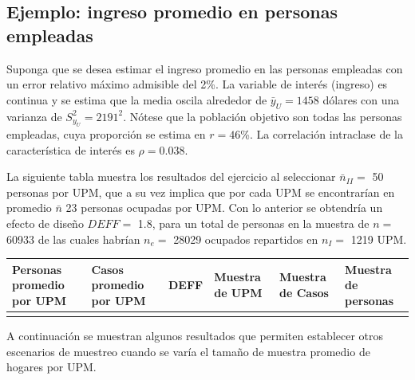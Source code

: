 \documentclass[
  12pt,
  spanish,
]{book}
\begin{document}
\hypertarget{ejemplo-ingreso-promedio-en-personas-empleadas}{%
\subsection{Ejemplo: ingreso promedio en personas empleadas}\label{ejemplo-ingreso-promedio-en-personas-empleadas}}

Suponga que se desea estimar el ingreso promedio en las personas empleadas con un error relativo máximo admisible del 2\%. La variable de interés (ingreso) es continua y se estima que la media oscila alrededor de \(\bar{y}_U=1458\) dólares con una varianza de \(S^2_{y_U}=2191^2\). Nótese que la población objetivo son todas las personas empleadas, cuya proporción se estima en \(r = 46\)\%. La correlación intraclase de la característica de interés es \(\rho = 0.038\).

La siguiente tabla muestra los resultados del ejercicio al seleccionar \(\bar{n}_{II} =\) 50 personas por UPM, que a su vez implica que por cada UPM se encontrarían en promedio \(\bar{n}\) 23 personas ocupadas por UPM. Con lo anterior se obtendría un efecto de diseño \(DEFF =\) 1.8, para un total de personas en la muestra de \(n =\) 60933 de las cuales habrían \(n_e =\) 28029 ocupados repartidos en \(n_{I} =\) 1219 UPM.

\begin{longtable}[]{@{}
  >{\centering\arraybackslash}p{}
  >{\centering\arraybackslash}p{}
  >{\centering\arraybackslash}p{}
  >{\centering\arraybackslash}p{}
  >{\centering\arraybackslash}p{}
  >{\centering\arraybackslash}p{}@{}}
\toprule
Personas promedio por UPM & Casos promedio por UPM & DEFF & Muestra de UPM & Muestra de Casos & Muestra de personas \\
\midrule
\endhead
50 & 23 & 1.8 & 1219 & 28029 & 60933 \\
\bottomrule
\end{longtable}

A continuación se muestran algunos resultados que permiten establecer otros escenarios de muestreo cuando se varía el tamaño de muestra promedio de hogares por UPM.
\end{document}
